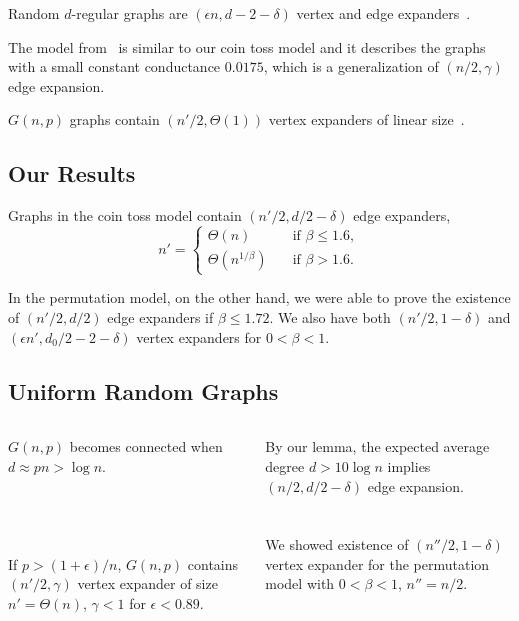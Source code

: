\documentclass{beamer}
\newcommand{\autotitle}{\secname\ifdefempty{\subsecname}{}{~--- \subsecname}}
\begin{document}
\begin{frame}{\autotitle}
    Random $d$-regular graphs are $(\epsilon n,d-2-\delta)$ vertex and edge expanders~\cite{hlw06}.
    
    The model from~\cite{gms03} is similar to our coin toss model
    and it describes the graphs with a small constant conductance $0.0175$,
    which is a generalization of $(n/2,\gamma)$ edge expansion.
    
    $G(n,p)$ graphs contain $(n'/2,\Theta(1))$ vertex expanders of linear size~\cite{kri17}.
\end{frame}

\subsection{Our Results}

\begin{frame}{\autotitle}
    Graphs in the coin toss model contain $(n'/2,d/2-\delta)$ edge expanders,
    \begin{equation*}
        n'=
        \begin{cases}
            \Theta(n) & \quad \text{if } \beta\leq 1.6,\\
            \Theta\left(n^{1/\beta}\right) & \quad \text{if } \beta>1.6.
        \end{cases}
    \end{equation*}

    In the permutation model, on the other hand, we were able to prove
    the existence of $(n'/2,d/2)$ edge expanders if $\beta\leq 1.72$.
    We also have both $(n'/2,1-\delta)$ and $(\epsilon n',d_0/2-2-\delta)$
    vertex expanders for $0<\beta<1$.
\end{frame}

\subsection{Uniform Random Graphs}

\begin{frame}{\autotitle}
    \begin{columns}[T,onlytextwidth]
        $G(n,p)$ becomes connected when $d\approx pn>\log n$.\\~\\~\\~\\~\\
        
        If $p>(1+\epsilon)/n$, $G(n,p)$ contains $(n'/2,\gamma)$ vertex expander
        of size $n'=\Theta(n)$, $\gamma<1$ for $\epsilon<0.89$.
        
        By our lemma, the expected average degree $d>10\log n$
        implies $(n/2,d/2-\delta)$ edge expansion.\\~\\~\\
        
        We showed existence of $(n''/2,1-\delta)$ vertex expander
        for the permutation model with $0<\beta<1$, $n''=n/2$.
    \end{columns}
\end{frame}
\end{document}
